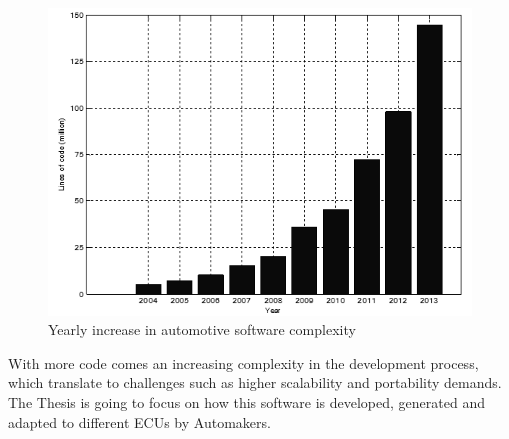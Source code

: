\documentclass[../main.tex]{subfiles}
\begin{document}
\begin{figure}[H]
    \centering
    \includegraphics[width=0.6\linewidth]{images_folder/Yearly-increase-in-automotive-software-complexity-shown-by-million-lines-of-code-of-1-ConvertImage.png}
    \caption{Yearly increase in automotive software complexity}
    \label{fig:yearlyincreas}
\end{figure}
With more code comes an increasing complexity in the development process, which translate to challenges such as higher scalability and portability demands. The Thesis is going to focus on how this software is developed, generated and adapted to different ECUs by Automakers.
\end{document}
